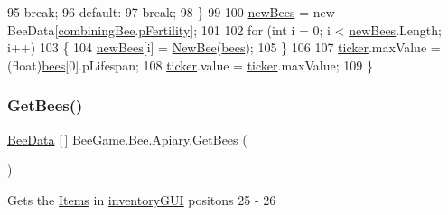 \begin{DoxyCode}
95                     \textcolor{keywordflow}{break};
96                 \textcolor{keywordflow}{default}:
97                     \textcolor{keywordflow}{break};
98             \}
99             
100             \hyperlink{class_bee_game_1_1_bee_1_1_apiary_a930b4325062b0d6c80581784c23976e8}{newBees} = \textcolor{keyword}{new} BeeData[\hyperlink{class_bee_game_1_1_bee_1_1_apiary_a3b3bbe1a8ba0be1c3310a2660b1cdf42}{combiningBee}.\hyperlink{struct_bee_game_1_1_bee_1_1_bee_data_a12b5a0d54c6c9162a69a88c349b044d1}{pFertility}];
101 
102             \textcolor{keywordflow}{for} (\textcolor{keywordtype}{int} i = 0; i < \hyperlink{class_bee_game_1_1_bee_1_1_apiary_a930b4325062b0d6c80581784c23976e8}{newBees}.Length; i++)
103             \{
104                 \hyperlink{class_bee_game_1_1_bee_1_1_apiary_a930b4325062b0d6c80581784c23976e8}{newBees}[i] = \hyperlink{class_bee_game_1_1_bee_1_1_apiary_ae3a597a3e45de14511f10d17bd5d539b}{NewBee}(\hyperlink{class_bee_game_1_1_bee_1_1_apiary_abcab0d8cecc18c58a9d01cdf997c7420}{bees});
105             \}
106 
107             \hyperlink{class_bee_game_1_1_bee_1_1_apiary_a7af4d39f709090d5e5f0c8877e3bbb8d}{ticker}.maxValue = (float)\hyperlink{class_bee_game_1_1_bee_1_1_apiary_abcab0d8cecc18c58a9d01cdf997c7420}{bees}[0].pLifespan;
108             \hyperlink{class_bee_game_1_1_bee_1_1_apiary_a7af4d39f709090d5e5f0c8877e3bbb8d}{ticker}.value = \hyperlink{class_bee_game_1_1_bee_1_1_apiary_a7af4d39f709090d5e5f0c8877e3bbb8d}{ticker}.maxValue;
109         \}
\end{DoxyCode}
\mbox{\label{class_bee_game_1_1_bee_1_1_apiary_a4aca0b267cdb220e7377165e30eb0324}} 
\subsubsection{\texorpdfstring{Get\+Bees()}{GetBees()}}
{\footnotesize\ttfamily \hyperlink{struct_bee_game_1_1_bee_1_1_bee_data}{Bee\+Data} \mbox{[}$\,$\mbox{]} Bee\+Game.\+Bee.\+Apiary.\+Get\+Bees (\begin{DoxyParamCaption}{ }\end{DoxyParamCaption})\hspace{0.3cm}{\ttfamily [private]}}



Gets the \hyperlink{namespace_bee_game_1_1_items}{Items} in \hyperlink{class_bee_game_1_1_inventory_1_1_inventory_base_a48dcba7ad7bfa1bed8c9ae290fb32857}{inventory\+G\+UI} positons 25 -\/ 26 

